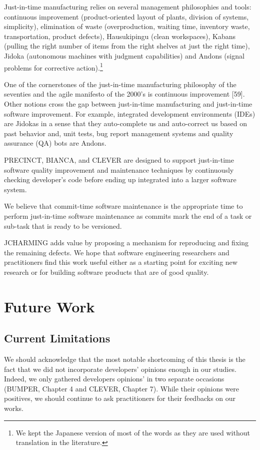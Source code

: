 \documentclass[12pt]{report}
\begin{document}
Just-in-time manufacturing relies on several management philosophies and
tools: continuous improvement (product-oriented layout of plants,
division of systems, simplicity), elimination of waste (overproduction,
waiting time, inventory waste, transportation, product defects),
Hausukipingu (clean workspaces), Kabans (pulling the right number of
items from the right shelves at just the right time), Jidoka (autonomous
machines with judgment capabilities) and Andons (signal problems for
corrective action).\footnote{We kept the Japanese version of most of the
  words as they are used without translation in the literature.}

One of the cornerstones of the just-in-time manufacturing philosophy of
the seventies and the agile manifesto of the 2000's is continuous
improvement {[}59{]}. Other notions cross the gap between just-in-time
manufacturing and just-in-time software improvement. For example,
integrated development environments (IDEs) are Jidokas in a sense that
they auto-complete us and auto-correct us based on past behavior and,
unit tests, bug report management systems and quality assurance (QA)
bots are Andons.

PRECINCT, BIANCA, and CLEVER are designed to support just-in-time
software quality improvement and maintenance techniques by continuously
checking developer's code before ending up integrated into a larger
software system.

We believe that commit-time software maintenance is the appropriate time
to perform just-in-time software maintenance as commits mark the end of
a task or sub-task that is ready to be versioned.

JCHARMING adds value by proposing a mechanism for reproducing and fixing
the remaining defects. We hope that software engineering researchers and
practitioners find this work useful either as a starting point for
exciting new research or for building software products that are of good
quality.

\section{Future Work}\label{future-work}

\subsection{Current Limitations}\label{current-limitations}

We should acknowledge that the most notable shortcoming of this thesis
is the fact that we did not incorporate developers' opinions enough in
our studies. Indeed, we only gathered developers opinions' in two
separate occasions (BUMPER, Chapter 4 and CLEVER, Chapter 7). While
their opinions were positives, we should continue to ask practitioners
for their feedbacks on our works.
\end{document}
